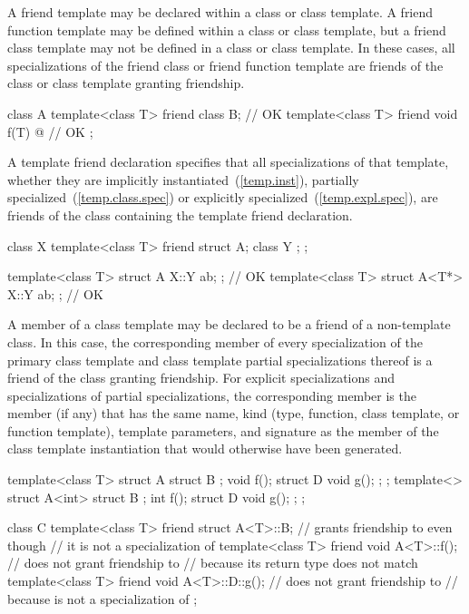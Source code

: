 \pnum
A friend template may be declared within a class or class template.
A friend function template may be defined within a class or class
template, but a friend class template may not be defined in a class
or class template.
In these cases, all specializations of the friend class or friend function
template are friends of the class or class template granting friendship.
\begin{example}
\begin{codeblock}
class A {
  template<class T> friend class B;                 // OK
  template<class T> friend void f(T){ @\commentellip@ }   // OK
};
\end{codeblock}
\end{example}

\pnum
A template friend declaration specifies that all specializations of that
template, whether they are implicitly instantiated~(\ref{temp.inst}), partially
specialized~(\ref{temp.class.spec}) or explicitly specialized~(\ref{temp.expl.spec}),
are friends of the class containing the template friend declaration.
\begin{example}
\begin{codeblock}
class X {
  template<class T> friend struct A;
  class Y { };
};

template<class T> struct A { X::Y ab; };            // OK
template<class T> struct A<T*> { X::Y ab; };        // OK
\end{codeblock}
\end{example}

\pnum
A member of a class template may be declared to be a friend of a
non-template class.
In this case,
the corresponding member of every specialization of
the primary class template and
class template partial specializations thereof
is a friend of the class granting friendship.
For
explicit specializations and
specializations of partial specializations,
the corresponding member is the member (if any)
that has the same name, kind (type, function, class template, or function
template), template parameters, and signature as the member of the class
template instantiation that would otherwise have been generated.
\begin{example}

\begin{codeblock}
template<class T> struct A {
  struct B { };
  void f();
  struct D {
    void g();
  };
};
template<> struct A<int> {
  struct B { };
  int f();
  struct D {
    void g();
  };
};

class C {
  template<class T> friend struct A<T>::B;    // grants friendship to  even though
                                              // it is not a specialization of 
  template<class T> friend void A<T>::f();    // does not grant friendship to 
                                              // because its return type does not match
  template<class T> friend void A<T>::D::g(); // does not grant friendship to 
                                              // because  is not a specialization of 
};
\end{codeblock}
\end{example}

